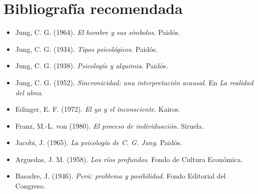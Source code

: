 	\section*{Bibliografía recomendada}
\begin{itemize}
	\item Jung, C. G. (1964). \emph{El hombre y sus símbolos}. Paidós.
	\item Jung, C. G. (1934). \emph{Tipos psicológicos}. Paidós.
	\item Jung, C. G. (1938). \emph{Psicología y alquimia}. Paidós.
	\item Jung, C. G. (1952). \emph{Sincronicidad: una interpretación acausal}. En \emph{La realidad del alma}.
	\item Edinger, E. F. (1972). \emph{El yo y el inconsciente}. Kairos.
	\item Franz, M.-L. von (1980). \emph{El proceso de individuación}. Siruela.
	\item Jacobi, J. (1965). \emph{La psicología de C. G. Jung}. Paidós.
	\item Arguedas, J. M. (1958). \emph{Los ríos profundos}. Fondo de Cultura Económica.
	\item Basadre, J. (1946). \emph{Perú: problema y posibilidad}. Fondo Editorial del Congreso.
\end{itemize}